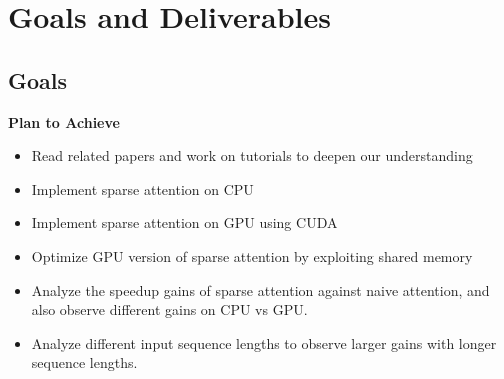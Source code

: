 \documentclass[11pt]{article}
\begin{document}





\section{Goals and Deliverables}
\subsection{Goals}

\textbf{Plan to Achieve}
\begin{itemize}
\itemsep 0em
    \item Read related papers and work on tutorials to deepen our understanding
    \item Implement sparse attention on CPU
    \item Implement sparse attention on GPU using CUDA
    \item Optimize GPU version of sparse attention by exploiting shared memory
    \item Analyze the speedup gains of sparse attention against naive attention, and also observe different gains on CPU vs GPU.
    \item Analyze different input sequence lengths to observe larger gains with longer sequence lengths.
\end{itemize}
\end{document}
